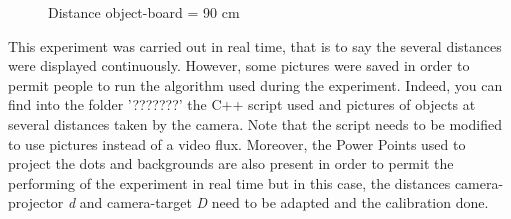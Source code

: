 \begin{figure}[!h] 
\centering
{}
\quad 
{}
\caption{Distance object-board = 90 cm}
\end{figure}


This experiment was carried out in real time, that is to say the several distances were displayed continuously. However, some pictures were saved in order to permit people to run the algorithm used during the experiment. Indeed, you can find into the folder '???????' the C++ script used and pictures of objects at several distances taken by the camera. Note that the script needs to be modified to use pictures instead of a video flux. Moreover, the Power Points used to project the dots and backgrounds are also present in order to permit the performing of the experiment in real time but in this case, the distances camera-projector \emph{d} and camera-target \emph{D} need to be adapted and the calibration done.


